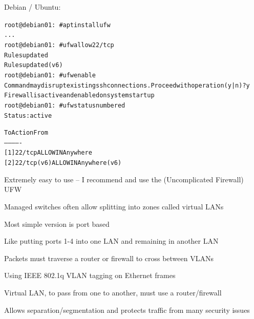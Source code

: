 \documentclass[Screen16to9,17pt]{foils}
\begin{document}

Debian / Ubuntu:
\begin{alltt}\scriptsize
root@debian01:~# apt install ufw
...
root@debian01:~# ufw allow 22/tcp
Rules updated
Rules updated (v6)
root@debian01:~# ufw enable
Command may disrupt existing ssh connections. Proceed with operation (y|n)? y
Firewall is active and enabled on system startup
root@debian01:~# ufw status numbered
Status: active

     To                         Action      From
     --                         ------      ----
[ 1] 22/tcp                     ALLOW IN    Anywhere
[ 2] 22/tcp (v6)                ALLOW IN    Anywhere (v6)
\end{alltt}

\begin{list2}
\item Extremely easy to use -- I recommend and use the (Uncomplicated Firewall) UFW
\end{list2}





\begin{list1}
\item Managed switches often allow splitting into zones called virtual LANs
\item Most simple version is port based
\item Like putting ports 1-4 into one LAN and remaining in another LAN
\item Packets must traverse a router or firewall to cross between VLANs
\end{list1}



\begin{list1}
\item Using IEEE 802.1q  VLAN tagging on Ethernet frames
\item Virtual LAN, to pass from one to another, must use a router/firewall
\item Allows separation/segmentation and protects traffic from many security issues
\end{list1}


\end{document}
